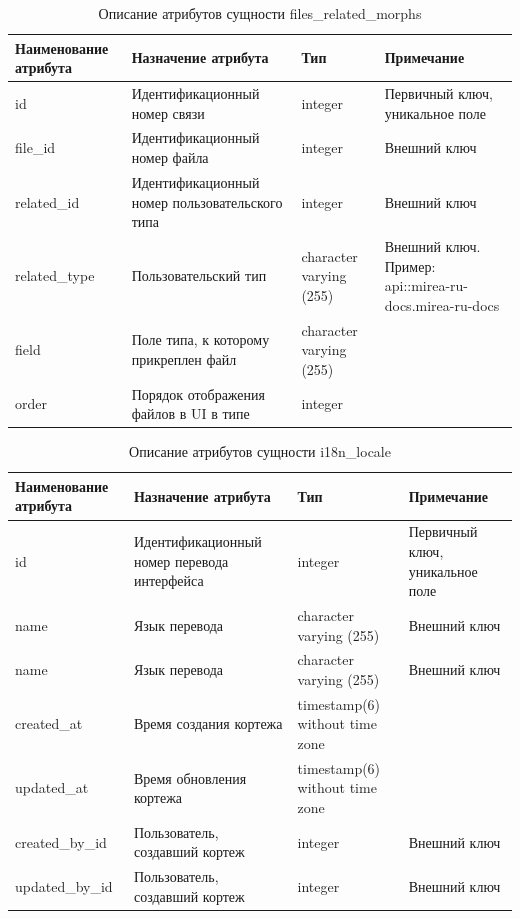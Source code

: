 \documentclass{mirea}
\begin{document}
	\begin{longtable}{ |p{}|p{}|p{}|p{}| } 
		\caption{Описание атрибутов сущности files\_related\_morphs}
		\endfirsthead
		\endhead
		\hline
		Наименование атрибута & Назначение атрибута & Тип & Примечание \\ \hline
		
		id & Идентификацион\-ный номер связи & integer & Первичный ключ, уникальное поле \\ \hline
		
		file\_id & Идентификацион\-ный номер файла & integer & Внешний ключ \\ \hline
		
		related\_id & Идентификацион\-ный номер пользовательского типа & integer & Внешний ключ \\ \hline
		
		related\_type & Пользовательский тип & character varying (255) & Внешний ключ. Пример: api::mirea-ru-docs.mirea-ru-docs \\ \hline
		
		field & Поле типа, к которому прикреплен файл & character varying (255) & \\ \hline
		
		order & Порядок отображения файлов в UI в типе & integer & \\ \hline
		
	\end{longtable}

	\begin{longtable}{ |p{}|p{}|p{}|p{}| } 
		\caption{Описание атрибутов сущности i18n\_locale}
		\endfirsthead
		\endhead
		\hline
		Наименование атрибута & Назначение атрибута & Тип & Примечание \\ \hline
		
		id & Идентификацион\-ный номер перевода интерфейса & integer & Первичный ключ, уникальное поле \\ \hline
		
		name & Язык перевода & character varying (255) & Внешний ключ \\ \hline
		
		name & Язык перевода & character varying (255) & Внешний ключ \\ \hline
		
		created\_at & Время создания кортежа & timestamp(6) without time zone & \\ \hline

		updated\_at & Время обновления кортежа & timestamp(6) without time zone & \\ \hline
		
		created\_by\_id & Пользователь, создавший кортеж & integer & Внешний ключ \\ \hline
		
		updated\_by\_id & Пользователь, создавший кортеж & integer & Внешний ключ \\ \hline
		
	\end{longtable}
\end{document}
